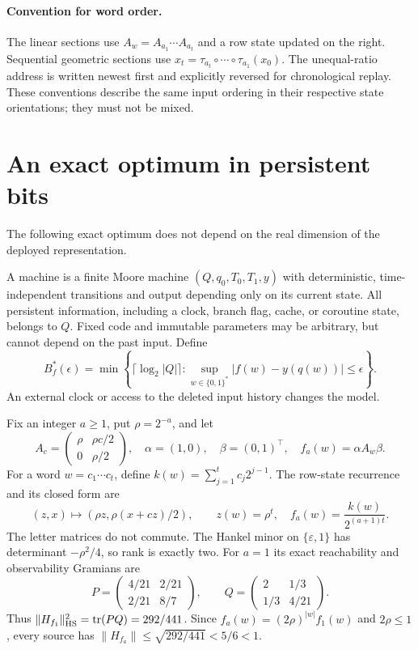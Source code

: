 \paragraph{Convention for word order.}
The linear sections use $A_w=A_{a_1}\cdots A_{a_t}$ and a row state
updated on the right. Sequential geometric sections use
$x_t=\tau_{a_t}\circ\cdots\circ\tau_{a_1}(x_0)$.
The unequal-ratio address is written newest first and explicitly reversed
for chronological replay. These conventions describe the same input
ordering in their respective state orientations; they must not be mixed.

\section{An exact optimum in persistent bits}\label{III:M:sec:memory}
The following exact optimum does not depend on
the real dimension of the deployed representation.

\begin{definition}\label{III:M:def:autonomous-memory}
A machine is a finite Moore machine $(Q,q_0,T_0,T_1,y)$ with deterministic,
time-independent transitions and output depending only on its current state.
All persistent information, including a clock, branch flag, cache, or
coroutine state, belongs to $Q$. Fixed code and immutable parameters may be
arbitrary, but cannot depend on the past input. Define
\[
 B_f^*(\epsilon)=\min\left\{\lceil\log_2|Q|\rceil:
       \sup_{w\in\{0,1\}^*}|f(w)-y(q(w))|\le\epsilon\right\}.
\]
An external clock or access to the deleted input history changes the model.
\end{definition}

Fix an integer $a\ge1$, put $\rho=2^{-a}$, and let
\[
 A_c=\begin{pmatrix}\rho&\rho c/2\\0&\rho/2\end{pmatrix},\quad
 \alpha=(1,0),\quad\beta=(0,1)^\top,\quad f_a(w)=\alpha A_w\beta.
\]
For a word $w=c_1\cdots c_t$, define $k(w)=\sum_{j=1}^tc_j2^{j-1}$.
The row-state recurrence and its closed form are
\[
 (z,x)\longmapsto(\rho z,\rho(x+cz)/2),\qquad
 z(w)=\rho^t,\quad f_a(w)=\frac{k(w)}{2^{(a+1)t}}.
\]
The letter matrices do not commute. The Hankel minor on
$\{\varepsilon,1\}$ has determinant $-\rho^2/4$, so rank is exactly
two. For $a=1$ its exact reachability and observability Gramians are
\[
 P=\begin{pmatrix}4/21&2/21\\2/21&8/7\end{pmatrix},\qquad
 Q=\begin{pmatrix}2&1/3\\1/3&4/21\end{pmatrix}.
\]
Thus $\|H_{f_1}\|_{\rm HS}^2=\operatorname{tr}(PQ)=292/441$.
Since $f_a(w)=(2\rho)^{|w|}f_1(w)$ and $2\rho\le1$, every source
has $\|H_{f_a}\|\le\sqrt{292/441}<5/6<1$.

